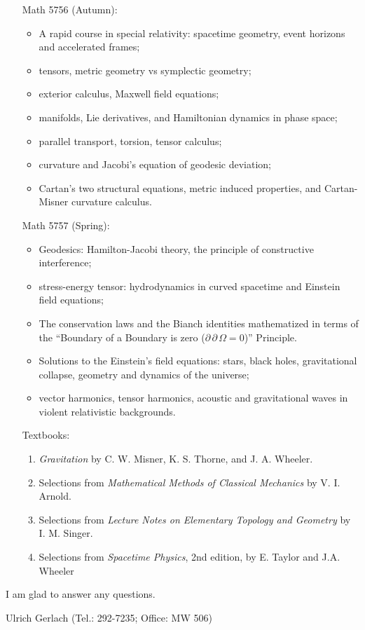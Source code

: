 \documentclass{article}
\begin{document}
\begin{enumerate}
\item[Math 5756 (Autumn):]
  \begin{itemize}
    \item  A rapid course in special relativity: spacetime geometry, 
      event horizons and accelerated frames;
    \item  tensors, metric geometry vs symplectic geometry;
    \item  exterior calculus, Maxwell field equations;
    \item  manifolds, Lie derivatives, and Hamiltonian dynamics in
           phase space;
    \item  parallel transport, torsion, tensor calculus;
    \item  curvature and Jacobi's equation of geodesic deviation;
    \item   Cartan's two structural equations, metric induced properties,
           and Cartan-Misner curvature calculus.
  \end{itemize}
\item[Math 5757 (Spring):]
  \begin{itemize}
    \item Geodesics: Hamilton-Jacobi theory, the principle of constructive
      interference;
    \item  stress-energy tensor: hydrodynamics in curved
           spacetime and Einstein field equations; 
    \item
      The conservation laws and the Bianch identities mathematized in terms of the ``Boundary of a Boundary is zero ($\partial\,\partial\, \Omega =0$)'' Principle.
    \item  Solutions to the Einstein's field equations: stars, black holes, gravitational collapse,  geometry and  dynamics of the universe; 
    \item vector harmonics, tensor harmonics, acoustic and
    gravitational waves in violent relativistic backgrounds.
  \end{itemize}
\item[Textbooks:]
  \begin{enumerate}
    \item
      \emph{Gravitation}  by C. W. Misner, K. S. Thorne, and J. A. Wheeler.
    \item
      Selections from \emph{Mathematical Methods of Classical Mechanics}
                by V. I. Arnold.
    \item
      Selections from \emph{Lecture Notes on Elementary Topology and
                Geometry}  by I. M. Singer.
    \item
      Selections from \emph{Spacetime Physics}, 2nd edition, by E. Taylor
                and J.A. Wheeler
  \end{enumerate}
\end{enumerate}

I am glad to answer any questions.

Ulrich Gerlach (Tel.: 292-7235; Office: MW 506)\\
~\\
\end{document}
